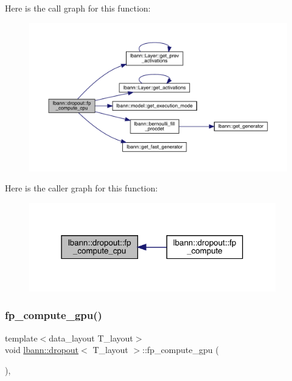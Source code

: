 Here is the call graph for this function\+:\nopagebreak
\begin{figure}[H]
\begin{center}
\leavevmode
\includegraphics[width=350pt]{classlbann_1_1dropout_a358c502d8e7eeb1fed8b5df468793b09_cgraph}
\end{center}
\end{figure}
Here is the caller graph for this function\+:\nopagebreak
\begin{figure}[H]
\begin{center}
\leavevmode
\includegraphics[width=304pt]{classlbann_1_1dropout_a358c502d8e7eeb1fed8b5df468793b09_icgraph}
\end{center}
\end{figure}
\mbox{\label{classlbann_1_1dropout_ad71de4282d2164171bbcad158a7bf1e7}} 
\subsubsection{\texorpdfstring{fp\+\_\+compute\+\_\+gpu()}{fp\_compute\_gpu()}}
{\footnotesize\ttfamily template$<$data\+\_\+layout T\+\_\+layout$>$ \\
void \hyperlink{classlbann_1_1dropout}{lbann\+::dropout}$<$ T\+\_\+layout $>$\+::fp\+\_\+compute\+\_\+gpu (\begin{DoxyParamCaption}{ }\end{DoxyParamCaption})\hspace{0.3cm}{\ttfamily [inline]}, {\ttfamily [private]}}



